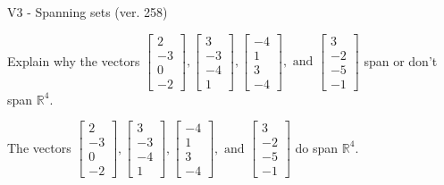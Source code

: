 \begin{exercise}
  \begin{exerciseTitle}V3 - Spanning sets (ver. 258)\end{exerciseTitle}
  \begin{exerciseStatement}
    Explain why the vectors \(\left[\begin{array}{r}
2 \\
-3 \\
0 \\
-2
\end{array}\right] , \left[\begin{array}{r}
3 \\
-3 \\
-4 \\
1
\end{array}\right] , \left[\begin{array}{r}
-4 \\
1 \\
3 \\
-4
\end{array}\right] , \text{ and } \left[\begin{array}{r}
3 \\
-2 \\
-5 \\
-1
\end{array}\right]\) span or don't span \(\mathbb{R}^4\). 
	


  \end{exerciseStatement}
  \begin{exerciseAnswer}
   The vectors \(\left[\begin{array}{r}
2 \\
-3 \\
0 \\
-2
\end{array}\right] , \left[\begin{array}{r}
3 \\
-3 \\
-4 \\
1
\end{array}\right] , \left[\begin{array}{r}
-4 \\
1 \\
3 \\
-4
\end{array}\right] , \text{ and } \left[\begin{array}{r}
3 \\
-2 \\
-5 \\
-1
\end{array}\right]\) 
  	 do  
	span \(\mathbb{R}^4\).
  


  \end{exerciseAnswer}
\end{exercise}